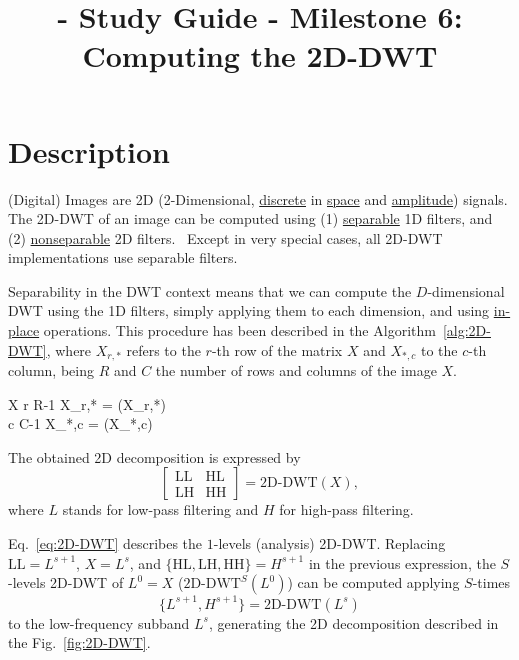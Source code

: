 
\title{\SM{} - Study Guide - Milestone 6: Computing the 2D-DWT}

\maketitle

\section{Description}

(Digital) Images are 2D (2-Dimensional,
\href{https://en.wikipedia.org/wiki/Discrete_time_and_continuous_time}{discrete}
in \href{https://en.wikipedia.org/wiki/Space}{space} and
\href{https://en.wikipedia.org/wiki/Amplitude}{amplitude})
signals. The 2D-DWT of an image can be computed using (1)
\href{https://en.wikipedia.org/wiki/Separable_filter}{separable} 1D
filters, and (2)
\href{https://en.wikipedia.org/wiki/Non-separable_wavelet}{nonseparable}
2D filters.~\cite{sayood2017introduction} Except in very special
cases, all 2D-DWT implementations use separable filters.

Separability in the DWT context means that we can compute the
$D$-dimensional DWT using the 1D filters, simply applying them to each
dimension, and
using \href{https://en.wikipedia.org/wiki/In-place_algorithm}{in-place}
operations. This procedure has been described in the
Algorithm~\ref{alg:2D-DWT}, where $X_{r,*}$ refers to the $r$-th row
of the matrix $X$ and $X_{*,c}$ to the $c$-th column, being $R$ and
$C$ the number of rows and columns of the image $X$.

\begin{pseudocode}{}{X}
  \label{alg:2D-DWT}
  \FOR r  \TO R-1 \DO
  X_{r,*} = (X_{r,*})
  \\
  \FOR c  \TO C-1 \DO
  X_{*,c} = (X_{*,c})
\end{pseudocode}

The obtained 2D decomposition is expressed by
\begin{equation}
  \begin{bmatrix}
    \text{LL} & \text{HL} \\
    \text{LH} & \text{HH}
  \end{bmatrix}
  =
  \text{2D-DWT}(X),
  \label{eq:2D-DWT}
\end{equation}
where $L$ stands for low-pass filtering and $H$ for high-pass
filtering.

Eq.~\ref{eq:2D-DWT} describes the $1$-levels (analysis)
2D-DWT. Replacing $\text{LL}=L^{s+1}$, $X=L^s$, and
$\{\text{HL}, \text{LH}, \text{HH}\}=H^{s+1}$ in the previous
expression, the $S$-levels 2D-DWT of $L^0=X$ ($\text{2D-DWT}^S(L^0)$)
can be computed applying $S$-times
\begin{equation}
  \{L^{s+1}, H^{s+1}\} = \text{2D-DWT}(L^s)
\end{equation}
to the low-frequency subband $L^s$, generating the 2D decomposition
described in the Fig.~\ref{fig:2D-DWT}.

